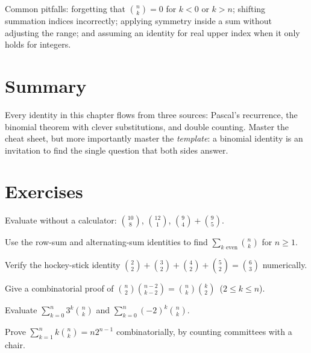 \begin{notebox}
Common pitfalls: forgetting that $\binom{n}{k} = 0$ for $k < 0$ or $k > n$;
shifting summation indices incorrectly; applying symmetry inside a sum
without adjusting the range; and assuming an identity for real upper index
when it only holds for integers.
\end{notebox}

\section{Summary}

Every identity in this chapter flows from three sources: Pascal's recurrence,
the binomial theorem with clever substitutions, and double counting. Master
the cheat sheet, but more importantly master the \emph{template}: a binomial
identity is an invitation to find the single question that both sides answer.

\section*{Exercises}

\begin{exercise}{\easy}
Evaluate without a calculator: $\binom{10}{8}$, $\binom{12}{1}$,
$\binom{9}{4} + \binom{9}{5}$.
\end{exercise}

\begin{exercise}{\easy}
Use the row-sum and alternating-sum identities to find
$\sum_{k \text{ even}} \binom{n}{k}$ for $n \geq 1$.
\end{exercise}

\begin{exercise}{\easy}
Verify the hockey-stick identity
$\binom{2}{2} + \binom{3}{2} + \binom{4}{2} + \binom{5}{2} = \binom{6}{3}$
numerically.
\end{exercise}

\begin{exercise}{\medium}
Give a combinatorial proof of
$\binom{n}{2}\binom{n-2}{k-2} = \binom{n}{k}\binom{k}{2}$ \,($2 \le k \le
n$).
\end{exercise}

\begin{exercise}{\medium}
Evaluate $\sum_{k=0}^{n} 3^{k} \binom{n}{k}$ and
$\sum_{k=0}^{n} (-2)^{k} \binom{n}{k}$.
\end{exercise}

\begin{exercise}{\medium}
Prove $\sum_{k=1}^{n} k\binom{n}{k} = n2^{n-1}$ combinatorially, by counting
committees with a chair.
\end{exercise}

